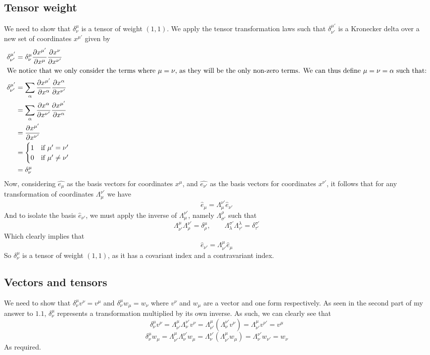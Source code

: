\documentclass{article}
\begin{document}
		\subsection{Tensor weight}
			We need to show that $\delta_\nu^\mu$ is a tensor of weight $(1,1)$. We apply the tensor transformation laws such that $\delta_{\nu'}^{\mu '}$ is a Kronecker delta over a new set of coordinates $x^{\mu'}$ given by
			\begin{align*}
				\delta_{\nu'}^{\mu '} &= \delta_{\nu}^\mu \frac{\partial x^{\mu'}}{\partial x^\mu} \frac{\partial x^\nu}{\partial x^{\nu '}} \\
			\intertext{We notice that we only consider the terms where $\mu = \nu$, as they will be the only non-zero terms. We can thus define $\mu=\nu=\alpha$ such that:}
				\delta_{\nu'}^{\mu '} &= \sum_\alpha \frac{\partial x^{\mu'}}{\partial x^\alpha} \frac{\partial x^\alpha}{\partial x^{\nu '}} \\
				&= \sum_\alpha \frac{\partial x^\alpha}{\partial x^{\nu '}}  \frac{\partial x^{\mu '}}{\partial x^\alpha} \\
				&= \frac{\partial x^{\mu '}}{\partial x^{\nu'}} \\
				&= 
					\begin{cases}
						1 & \text{if } \mu' = \nu' \\
						0 & \text{if } \mu' \neq \nu' 
					\end{cases} \\
				&= \delta_{\nu}^\mu
			\end{align*}
			Now, considering $\hat{e_\mu}$ as the basis vectors for coordinates $x^\mu$, and $\hat{e_{\nu'}}$ as the basis vectors for coordinates $x^{\nu'}$, it follows that for any transformation of coordinates $\Lambda^{\nu'}_{\mu}$ we have
			$$ \hat{e}_\mu = \Lambda_\mu^{\nu'} \hat{e}_{\nu'}$$
			And to isolate the basis $\hat{e}_{\nu'}$, we must apply the inverse of $\Lambda_{\mu}^{\nu'}$, namely $\Lambda_{\sigma'}^\rho$ such that
			$$ \Lambda_{\nu'}^{\mu}\Lambda_{\rho}^{\nu'} = \delta_\rho^\mu, \quad \quad \Lambda_{\lambda}^{\sigma'} \Lambda_{\tau'}^{\lambda} = \delta_{\tau'}^{\sigma'}$$
			Which clearly implies that
			$$ \hat{e}_{\nu'} = \Lambda^\mu_{\nu'} \hat{e}_\mu$$
			So $\delta_{\nu}^\mu$ is a tensor of weight $(1,1)$, as it has a covariant index and a contravariant index.
		\subsection{Vectors and tensors}
			We need to show that $\delta_\nu^\mu v^\nu = v^\mu$ and $\delta_{\nu}^{\mu} w_\mu = w_\nu$ where $v^\nu$ and $w_\mu$ are a vector and one form respectively. As seen in the second part of my answer to $1.1$, $\delta_{\nu}^\mu$ represents a transformation multiplied by its own inverse. As such, we can clearly see that
			$$ \delta_\nu^\mu v^\nu = \Lambda_{\nu'}^\mu \Lambda_{\nu}^{\nu'} v^\nu = \Lambda_{\nu'}^{\mu} ( \Lambda_{\nu}^{\nu'}  v^\nu) = \Lambda_{\nu'}^{\mu} v^{\nu'} = v^\mu$$
			$$ \delta_\nu^\mu w_\mu = \Lambda_{\nu'}^\mu \Lambda_{\nu}^{\nu'} w_\mu = \Lambda_{\nu}^{\nu'}(\Lambda_{\nu'}^{\mu}w_\mu)  = \Lambda_{\nu}^{\nu'} w_{\nu'} = w_\nu  $$
			As required.
\end{document}
